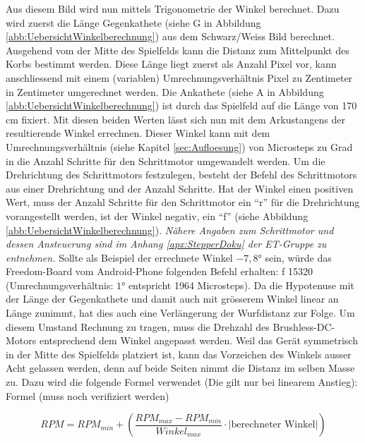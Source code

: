 Aus diesem Bild wird nun mittels Trigonometrie der Winkel berechnet. 
Dazu wird zuerst die Länge Gegenkathete (siehe G in Abbildung \ref{abb:UebersichtWinkelberechnung}) 
aus dem Schwarz/Weiss Bild berechnet. Ausgehend vom der Mitte des Spielfelds kann die Distanz zum Mittelpunkt des 
Korbs bestimmt werden. Diese Länge liegt zuerst als Anzahl Pixel vor, 
kann anschliessend mit einem (variablen) Umrechnungsverhältnis Pixel zu Zentimeter in Zentimeter umgerechnet werden.
Die Ankathete (siehe A in Abbildung \ref{abb:UebersichtWinkelberechnung}) ist durch das Spielfeld auf die Länge von 170 cm fixiert.
Mit diesen beiden Werten lässt sich nun mit dem Arkustangens der resultierende Winkel errechnen.
Dieser Winkel kann mit dem Umrechnungsverhältnis (siehe Kapitel \ref{sec:Aufloesung}) von Microsteps zu Grad 
in die Anzahl Schritte für den Schrittmotor umgewandelt werden. Um die Drehrichtung des Schrittmotors festzulegen, besteht der 
Befehl des Schrittmotors aus einer Drehrichtung und der Anzahl Schritte. Hat der Winkel einen positiven Wert, muss der Anzahl 
Schritte für den Schrittmotor ein  \enquote{r} für die Drehrichtung vorangestellt werden, ist der Winkel negativ, ein  \enquote{f} 
(siehe Abbildung \ref{abb:UebersichtWinkelberechnung}).  
\newline
\newline
\textit{Nähere Angaben zum Schrittmotor und dessen Ansteuerung sind im Anhang \ref{apx:StepperDoku} der ET-Gruppe zu entnehmen.}
\newline
\newline
Sollte als Beispiel der errechnete Winkel $-7,8\si{\degree}$ sein, würde das Freedom-Board vom Android-Phone folgenden 
Befehl erhalten: f 15320 (Umrechnungsverhältnis: $1\si{\degree}$ entspricht 1964 Microsteps).
Da die Hypotenuse mit der Länge der Gegenkathete und damit auch mit grösserem Winkel linear an Länge zunimmt, 
hat dies auch eine Verlängerung der Wurfdistanz zur Folge. Um diesem Umstand Rechnung zu tragen, muss die Drehzahl des 
Brushless-DC-Motors entsprechend dem Winkel angepasst werden. Weil das Gerät symmetrisch in der Mitte des Spielfelds platziert ist, 
kann das Vorzeichen des Winkels ausser Acht gelassen werden, denn auf beide Seiten nimmt die Distanz im selben Masse zu.
Dazu wird die folgende Formel verwendet (Die gilt nur bei linearem Anstieg):
\newline
\newline
Formel (muss noch verifiziert werden)
 
\begin{equation}
RPM = RPM_{min} +  \left( \frac{RPM_{max} -RPM_{min}}{Winkel_{max}} \cdot |\text{berechneter Winkel}| \right)
\end{equation}
 

